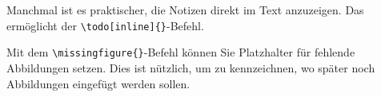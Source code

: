Manchmal ist es praktischer, die Notizen direkt im Text anzuzeigen. Das
ermöglicht der \texttt{\textbackslash todo[inline]\{\}}-Befehl.


Mit dem \texttt{\textbackslash missingfigure\{\}}-Befehl können Sie Platzhalter
für fehlende Abbildungen setzen. Dies ist nützlich, um zu kennzeichnen, wo
später noch Abbildungen eingefügt werden sollen.


